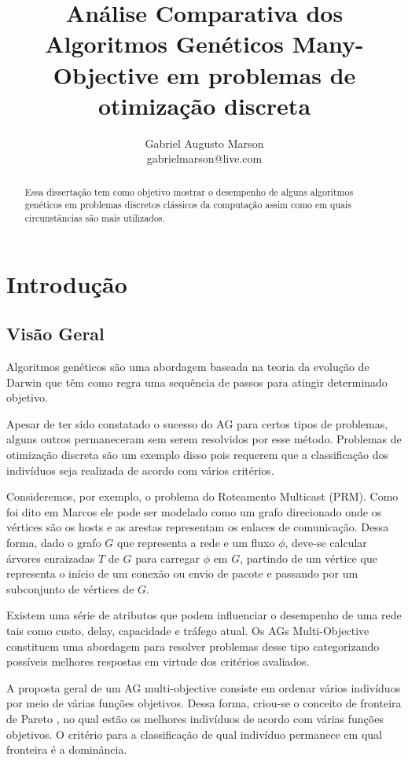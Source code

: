 \documentclass[]{article}
\title{Análise Comparativa dos Algoritmos Genéticos Many-Objective em problemas de otimização discreta}
\author{Gabriel Augusto Marson\\ gabrielmarson@live.com }
\begin{document}
\maketitle

\begin{abstract}
	
	\noindent Essa dissertação tem como objetivo mostrar o desempenho de alguns algoritmos genéticos em problemas discretos clássicos da computação assim como em quais circunstâncias são mais utilizados.
	
\end{abstract}

\section{Introdução}

\subsection{Visão Geral}	

	Algoritmos genéticos são uma abordagem baseada na teoria da evolução de Darwin que têm como regra uma sequência de passos para atingir determinado objetivo. 
	
	Apesar de ter sido constatado o sucesso do AG para certos tipos de problemas, alguns outros permaneceram sem serem resolvidos por esse método. Problemas de otimização discreta são um exemplo disso pois requerem que a classificação dos indivíduos seja realizada de acordo com vários critérios.
		
	Consideremos, por exemplo, o problema do Roteamento Multicast (PRM). Como foi dito em Marcos \cite{bueno2010heuristicas} ele pode ser modelado como um grafo direcionado onde os vértices são os hosts e as arestas representam os enlaces de comunicação. Dessa forma, dado o grafo $G$ que representa a rede e um fluxo $\phi$, deve-se calcular árvores enraizadas $T$ de $G$ para carregar $\phi$ em $G$, partindo de um vértice que representa o início de um conexão ou envio de pacote e passando por um subconjunto de vértices de $G$.
	
	Existem uma série de atributos que podem influenciar o desempenho de uma rede tais como custo, delay, capacidade e tráfego atual. Os AGs Multi-Objective constituem uma abordagem para resolver problemas desse tipo categorizando possíveis melhores respostas em virtude dos critérios avaliados.
	
	A proposta geral de um AG multi-objective consiste em ordenar vários indivíduos por meio de várias funções objetivos. Dessa forma, criou-se o conceito de fronteira de Pareto  \cite{Pareto}, no qual estão os melhores indivíduos de acordo com várias funções objetivos. O critério para a classificação de qual indivíduo permanece em qual fronteira é a dominância.
	
\end{document}
